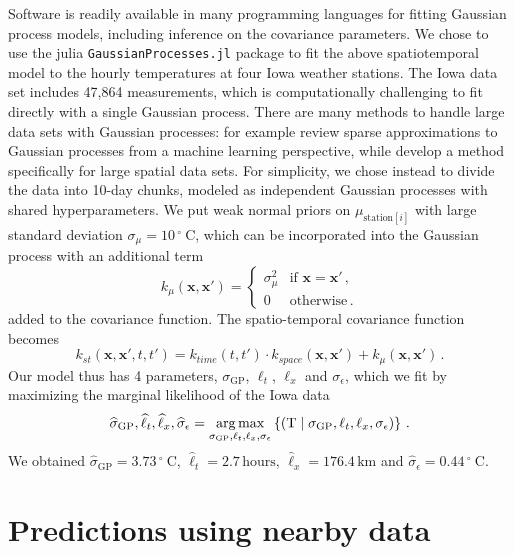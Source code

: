 \documentclass[letter]{article}
\newcommand{\genericdel}[3]{%
      \left#1#3\right#2
    }
\newcommand{\del}[1]{\genericdel(){#1}}
\newcommand{\sbr}[1]{\genericdel[]{#1}}
\newcommand{\cbr}[1]{\genericdel\{\}{#1}}
\DeclareMathOperator*{\argmax}{arg\,max}
\let\Pr\relax
\DeclareMathOperator{\Pr}{\mathbb{P}}
\newcommand{\T}{\mathrm{T}}
\newcommand{\station}[1]{\mathrm{station}\sbr{#1}}
\newcommand{\xvec}{\mathbold{x}}
\newcommand{\sigmaf}{\sigma_{\mathrm{GP}}}
\newcommand{\sigman}{\sigma_{\epsilon}}
\newcommand{\degreeC}{{}^{\circ}~\mathrm{C}}
\renewcommand{\cite}[1]{\citep{#1}}
\begin{document}
Software is readily available in many programming languages for fitting Gaussian process models, including inference on the covariance parameters. We chose to use the julia \texttt{GaussianProcesses.jl} package to fit the above spatiotemporal model to the hourly temperatures at four Iowa weather stations.
The Iowa data set includes 47,864 measurements, which is computationally challenging to fit directly with a single Gaussian process.
There are many methods to handle large data sets with Gaussian processes: for example \cite{quinonero2007approximation} review sparse approximations to Gaussian processes from a machine learning perspective, while \cite{banerjee2008gaussian} develop a method specifically for large spatial data sets.
For simplicity, we chose instead to divide the data into 10-day chunks, modeled as independent Gaussian processes with shared hyperparameters.
We put weak normal priors on \(\mu_{\station{i}}\) with large standard deviation \(\sigma_{\mu}=10\,\degreeC\), which can be incorporated into the Gaussian process with an additional term
\begin{equation}
    k_{\mu}(\xvec, \xvec') = \begin{cases}
\sigma_\mu^2 &\text{if } \xvec = \xvec'\,, \\
0 &\text{otherwise}\,.
\end{cases}
\end{equation}
added to the covariance function.
The spatio-temporal covariance function becomes
\begin{equation}
    k_{st}(\xvec,\xvec',t,t') = k_{time}(t,t') \cdot k_{space}(\xvec, \xvec') + k_\mu(\xvec, \xvec') \,.
\end{equation}
Our model thus has 4 parameters, \(\sigmaf\), \(\ell_t\), \(\ell_x\) and \(\sigman\), which we fit by maximizing the marginal likelihood of the Iowa data
\begin{equation}
\label{eq:optimization}
\widehat\sigmaf,\widehat\ell_t,\widehat\ell_x,\widehat\sigman = \argmax_{\sigmaf,\ell_t,\ell_x,\sigman} \cbr{ \Pr\del{ \T \mid {\sigmaf,\ell_t,\ell_x,\sigman} } }\,.
\end{equation}
We obtained \(\widehat\sigmaf=3.73\,\degreeC\), \(\widehat\ell_t=2.7\,\mathrm{hours}\), \(\widehat\ell_x=176.4\,\mathrm{km}\) and \(\widehat\sigman=0.44\,\degreeC\).
    
\section{Predictions using nearby data}\label{predictions-using-nearby-data}
    
\end{document}
